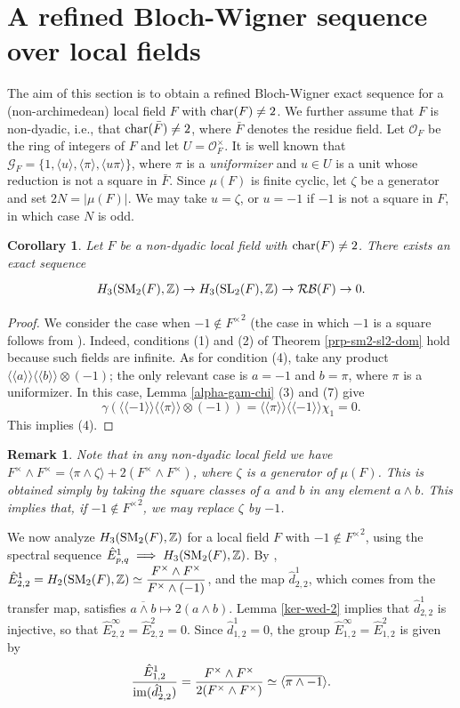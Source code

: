 \documentclass[11pt]{amsart}
\theoremstyle{definition}
\theoremstyle{plain}
\newtheorem{cor}[ntn]{Corollary}
\newtheorem{rem}[ntn]{Remark}
\numberwithin{equation}{section}
\newcommand{\z}{\mathbb{Z}}
\newcommand{\GG}{\mathcal{G}}
\newcommand{\RB}{\mathcal{RB}}
\newcommand{\lan}{\langle}
\newcommand{\ran}{\rangle}
\newcommand{\arr}{\rightarrow}
\newcommand{\Lan}{\langle \! \langle}
\newcommand{\Ran}{\rangle \! \rangle}
\newcommand{\SL}{\mathit{{\rm SL}}}
\newcommand{\SM}{\mathit{{\rm SM}}}
\newcommand{\im}{{\rm im}}
\renewcommand{\char}{{\rm char}}
\begin{document}
\section{A refined Bloch-Wigner sequence over local fields}
The aim of this section is to obtain a refined Bloch-Wigner exact sequence for a (non-archimedean) local field $F$ with $\char(F)\neq 2$. We further assume that $F$ is non-dyadic, i.e., that $\char(\bar{F})\neq 2$, where $\bar{F}$ denotes the residue field. Let $\mathcal{O}_F$ be the ring of integers of $F$ and let $U=\mathcal{O}_F^\times$. It is well known that $\GG_F=\{1,\lan u\ran,\lan \pi\ran,\lan u\pi\ran\}$, where $\pi$ is a {\it uniformizer} and $u\in U$ is a unit whose reduction is not a square in $\bar{F}$. Since $\mu(F)$ is finite cyclic, let $\zeta$ be a generator and set $2N=|\mu(F)|$. We may take $u=\zeta$, or $u=-1$ if $-1$ is not a square in $F$, in which case $N$ is odd.  
\begin{cor}\label{sm2-sl2-seq-local}
    Let $F$ be a non-dyadic local field with $\char(F)\neq 2$. There exists an exact sequence
    \[
        \begin{tikzcd}
            H_3(\SM_2(F),\z)\arr H_3(\SL_2(F),\z)\arr \RB(F) \arr 0.
        \end{tikzcd}
    \]
\end{cor}
\begin{proof}
    We consider the case when $-1\notin {F^{\times}}^2$ (the case in which $-1$ is a square follows from \cite[Corollary 6.4]{B-E--2023}). Indeed, conditions (1) and (2) of Theorem \ref{prp-sm2-sl2-dom} hold because such fields are infinite. As for condition (4), take any product $\Lan a\Ran\Lan b\Ran\otimes(-1)$; the only relevant case is $a=-1$ and $b=\pi$, where $\pi$ is a uniformizer. In this case, Lemma \ref{alpha-gam-chi} (3) and (7) give
    \[
        \gamma(\Lan -1\Ran\Lan \pi\Ran\otimes(-1))=\Lan \pi\Ran\Lan -1\Ran\chi_1=0.
    \]
    This implies (4).
\end{proof}
\begin{rem}
    \label{lf-classes}
    Note that in any non-dyadic local field we have $F^\times\wedge F^\times=\lan\pi\wedge\zeta\ran+2(F^\times\wedge F^\times)$, where $\zeta$ is a generator of $\mu(F)$. This is obtained simply by taking the square classes of $a$ and $b$ in any element $a\wedge b$. This implies that, if $-1\notin {F^\times}^2$, we may replace $\zeta$ by $-1$.
\end{rem}

We now analyze $H_3(\SM_2(F),\z)$ for a local field $F$ with $-1\notin {F^\times}^2$, using the spectral sequence $\hat{E}^1_{p,q}\implies H_3(\SM_2(F),\z)$. By \cite[Lemma 5.1]{B-E--2023}, $\displaystyle \hat{E}^1_{2,2}=H_2(\SM_2(F),\z)\simeq\frac{F^\times\wedge F^\times}{F^\times\wedge(-1)}$, and the map $\hat{d}^1_{2,2}$, which comes from the transfer map, satisfies $\overline{a\wedge b}\mapsto 2(a\wedge b)$. Lemma \ref{ker-wed-2} implies that $\hat{d}^1_{2,2}$ is injective, so that $\hat{E}^{\infty}_{2,2}=\hat{E}^2_{2,2}=0$. Since $\hat{d}^1_{1,2}=0$, the group $\hat{E}^{\infty}_{1,2}=\hat{E}^2_{1,2}$ is given by 
\[
    \frac{\hat{E}^1_{1,2}}{\im(\hat{d}^1_{2,2})}=\frac{F^\times\wedge F^\times}{2(F^\times\wedge F^\times)}\simeq\lan\overline{\pi\wedge-1}\ran.
\]
\end{document}
